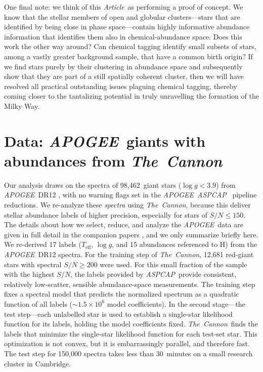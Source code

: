 \documentclass[12pt, letterpaper, preprint]{aastex}
\newcommand{\acronym}[1]{{\small{#1}}}
\newcommand{\project}[1]{\textsl{#1}}
\newcommand{\apogee}{\project{\acronym{APOGEE}}}
\newcommand{\aspcap}{\project{\acronym{ASPCAP}}}
\newcommand{\thecannon}{\project{The~Cannon}}
\newcommand{\documentname}{\textsl{Article}}
\newcommand{\teff}{T_{\mathrm{eff}}}
\newcommand{\logg}{\log g}
\newcommand{\totalnumber}{98,462}
\begin{document}
One final note:
we think of this \documentname\ as performing a proof of concept.
We know that the stellar members of open and globular clusters---stars
that are identified by being close in phase space---contain highly
informative abundance information that identifies them also in
chemical-abundance space.  Does this work the other way around? 
Can chemical tagging identify small subsets of stars, among a vastly
greater background sample, that have a common birth origin? If we 
find stars purely by their clustering in abundance space and subsequently
show that they are part of a still spatially coherent cluster, then
we will have resolved all practical outstanding issues plaguing 
chemical tagging, thereby coming closer to the tantalizing potential 
in truly unravelling the formation of the Milky Way.

\section{Data: \apogee\ giants with abundances from \thecannon}\label{sec:data}

Our analysis draws on the spectra of \totalnumber\ giant stars ($\logg
< 3.9$) from \apogee\ \acronym{DR12} \citep{dr12}, with no warning flags
set in the \apogee\ \aspcap\ \citep{aspcap} pipeline
reductions.
We re-analyze these \emph{spectra} using \thecannon, because this
deliver stellar abundance labels of higher precision, especially for
stars of $S/N \le 150$.
The details about how we select, reduce, and analyze the \apogee\ data
are given in full detail in the companion papers \citep{casey16,
  ness16}, and we only summarize briefly here.
We re-derived 17 labels ($\teff$, $\logg$, and 15 abundances
referenced to H) from the \apogee\ \acronym{DR12} spectra. 
For the training step of \thecannon, 
12,681 red-giant stars with spectral $S/N \ge 200$ were used.
For this small fraction of the sample with the highest $S/N$, the
labels provided by \aspcap\ provide consistent, relatively low-scatter, sensible
abundance-space measurements.
The training step fixes a spectral model
that predicts the normalized spectrum as a quadratic function of all
labels ($\sim 1.5\times10^6$ model coefficients). In the second stage---the test step---each unlabelled star is
used to establish a single-star likelihood function for its labels,
holding the model coefficients fixed.
\thecannon\ finds the labels that minimize the single-star likelihood
function for each test-set star.
This optimization is not convex, but it is embarrassingly parallel,
and therefore fast. The test
step for 150,000 spectra takes less than 30~minutes on a small 
research cluster in Cambridge.
\end{document}
